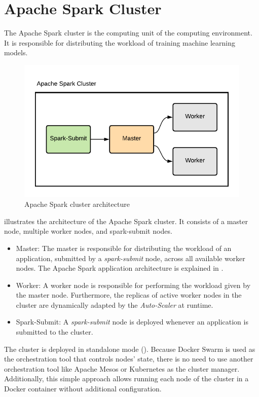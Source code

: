 \section{Apache Spark Cluster}
\label{sec:05_spark}
The Apache Spark cluster is the computing unit of the computing environment. It is responsible for distributing the workload of training machine learning models.
\begin{figure}[h]
\centering
\includegraphics[scale=1]{images/05_conceptual_design/apache_spark/apache_spark_cluster}
\caption{Apache Spark cluster architecture}
\label{fig:05_spark_arch}
\end{figure}
 illustrates the architecture of the Apache Spark cluster. It consists of a master node, multiple worker nodes, and spark-submit nodes.

\begin{itemize}
\item Master: The master is responsible for distributing the workload of an application, submitted by a \textit{spark-submit} node, across all available worker nodes. The Apache Spark application architecture is explained in .

\item Worker: A worker node is responsible for performing the workload given by the master node. Furthermore, the replicas of active worker nodes in the cluster are dynamically adapted by the \textit{Auto-Scaler} at runtime.

\item Spark-Submit: A \textit{spark-submit} node is deployed whenever an application is submitted to the cluster.
\end{itemize}
The cluster is deployed in standalone mode (). Because Docker Swarm is used as the orchestration tool that controls nodes' state, there is no need to use another orchestration tool like Apache Mesos or Kubernetes as the cluster manager.
Additionally, this simple approach allows running each node of the cluster in a Docker container without additional configuration.


